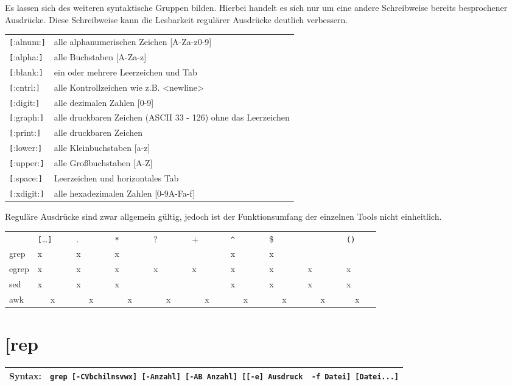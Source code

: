 \documentclass[12pt,]{article}
\begin{document}
Es lassen sich des weiteren syntaktische Gruppen bilden. Hierbei handelt
es sich nur um eine andere Schreibweise bereits besprochener Ausdrücke.
Diese Schreibweise kann die Lesbarkeit regulärer Ausdrücke deutlich
verbessern.

\begin{longtable}[c]{@{}ll@{}}
\toprule
\texttt{{[}}:alnum:\texttt{{]}} & alle alphanumerischen Zeichen
{[}A-Za-z0-9{]}\tabularnewline
\texttt{{[}}:alpha:\texttt{{]}} & alle Buchstaben
{[}A-Za-z{]}\tabularnewline
\texttt{{[}}:blank:\texttt{{]}} & ein oder mehrere Leerzeichen und
Tab\tabularnewline
\texttt{{[}}:cntrl:\texttt{{]}} & alle Kontrollzeichen wie z.B.
\textless{}newline\textgreater{}\tabularnewline
\texttt{{[}}:digit:\texttt{{]}} & alle dezimalen Zahlen
{[}0-9{]}\tabularnewline
\texttt{{[}}:graph:\texttt{{]}} & alle druckbaren Zeichen (ASCII 33 -
126) ohne das Leerzeichen\tabularnewline
\texttt{{[}}:print:\texttt{{]}} & alle druckbaren Zeichen\tabularnewline
\texttt{{[}}:lower:\texttt{{]}} & alle Kleinbuchstaben
{[}a-z{]}\tabularnewline
\texttt{{[}}:upper:\texttt{{]}} & alle Großbuchstaben
{[}A-Z{]}\tabularnewline
\texttt{{[}}:space:\texttt{{]}} & Leerzeichen und horizontales
Tab\tabularnewline
\texttt{{[}}:xdigit:\texttt{{]}} & alle hexadezimalen Zahlen
{[}0-9A-Fa-f{]}\tabularnewline
\bottomrule
\end{longtable}

Reguläre Ausdrücke sind zwar allgemein gültig, jedoch ist der
Funktionsumfang der einzelnen Tools nicht einheitlich.

\begin{longtable}[c]{@{}llllllllll@{}}
\toprule
~ & \texttt{{[}}\ldots{}\texttt{{]}} & . & \texttt{*} & ? & + &
\texttt{\^{}} & \$ & \textbar{} & \texttt{()}\tabularnewline
grep & x & x & x & ~ & ~ & x & x & ~ & ~\tabularnewline
egrep & x & x & x & x & x & x & x & x & x\tabularnewline
sed & x & x & x & ~ & ~ & x & x & x & x\tabularnewline
awk & ~~~x~~~ & ~~~x~~~ & ~~~x~~~ & ~~~x~~~ & ~~~x~~~ & ~~~x~~~ &
~~~x~~~ & ~~~x~~~ & ~~x~~~\tabularnewline
\bottomrule
\end{longtable}

\section{{[}rep}\label{rep}

\begin{longtable}[c]{@{}ll@{}}
\toprule
Syntax: &
\texttt{grep\ {[}-CVbchilnsvwx{]}\ {[}-Anzahl{]}\ {[}-AB\ Anzahl{]}\ {[}{[}-e{]}\ Ausdruck\ \textbar{}\ -f\ Datei{]}\ {[}Datei...{]}}\tabularnewline
\bottomrule
\end{longtable}
\end{document}
